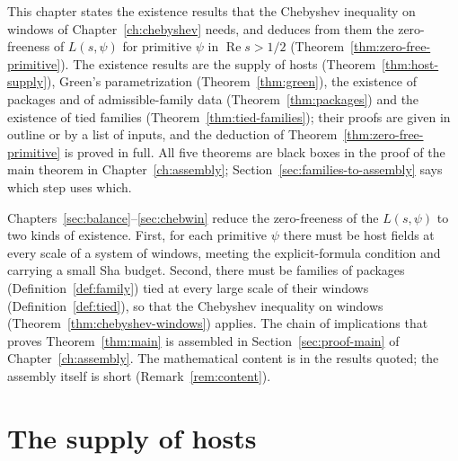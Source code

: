 \documentclass[11pt]{amsbook}
\theoremstyle{plain}
\theoremstyle{definition}
\theoremstyle{remark}
\numberwithin{equation}{section}
\numberwithin{figure}{chapter}
\numberwithin{table}{chapter}
\begin{document}
This chapter states the existence results that the Chebyshev
inequality on windows of Chapter~\ref{ch:chebyshev} needs, and deduces
from them the zero-freeness of $L(s,\psi)$ for primitive $\psi$ in
$\operatorname{Re}s>1/2$ (Theorem~\ref{thm:zero-free-primitive}). The
existence results are the supply of hosts
(Theorem~\ref{thm:host-supply}), Green's parametrization
(Theorem~\ref{thm:green}), the existence of packages and of
admissible-family data (Theorem~\ref{thm:packages}) and the existence
of tied families (Theorem~\ref{thm:tied-families}); their proofs are
given in outline or by a list of inputs, and the deduction of
Theorem~\ref{thm:zero-free-primitive} is proved in full. All five
theorems are black boxes in the proof of the main theorem in
Chapter~\ref{ch:assembly}; Section~\ref{sec:families-to-assembly} says
which step uses which.

Chapters~\ref{sec:balance}--\ref{sec:chebwin} reduce the zero-freeness
of the $L(s,\psi)$ to two kinds of existence. First, for each
primitive $\psi$ there must be host fields at every scale of a system
of windows, meeting the explicit-formula condition and carrying a
small Sha budget. Second, there must be families of packages
(Definition~\ref{def:family}) tied at every large scale of their
windows (Definition~\ref{def:tied}), so that the Chebyshev inequality
on windows (Theorem~\ref{thm:chebyshev-windows}) applies. The chain
of implications that proves Theorem~\ref{thm:main} is assembled in
Section~\ref{sec:proof-main} of Chapter~\ref{ch:assembly}. The
mathematical content is in the results quoted; the assembly itself is short
(Remark~\ref{rem:content}).

\section{The supply of hosts}
\end{document}
